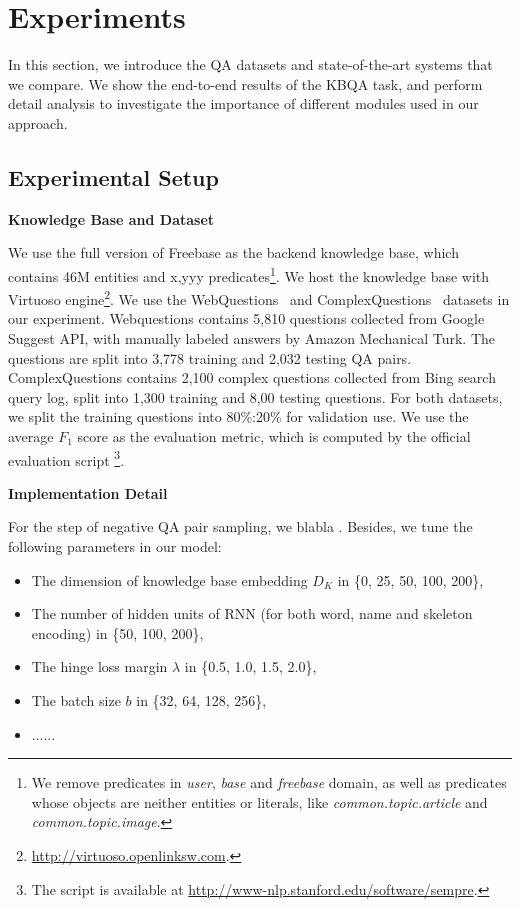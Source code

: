 \section{Experiments}

In this section, we introduce the QA datasets and state-of-the-art systems
that we compare.
We show the end-to-end results of the KBQA task,
and perform detail analysis to investigate the importance of different modules
used in our approach.



\subsection{Experimental Setup}

\noindent
\textbf{Knowledge Base and Dataset}

\noindent
We use the full version of Freebase as the backend knowledge base,
which contains 46M entities and x,yyy predicates\footnote{
We remove predicates in \textit{user}, \textit{base} and \textit{freebase} domain,
as well as predicates whose objects are neither entities or literals, 
like \textit{common.topic.article} and \textit{common.topic.image}.
}.
We host the knowledge base with Virtuoso engine\footnote{\url{http://virtuoso.openlinksw.com}.}.
We use the WebQuestions~\cite{} and ComplexQuestions~\cite{} datasets in our experiment.
Webquestions contains 5,810 questions collected from Google Suggest API,
with manually labeled answers by Amazon Mechanical Turk.
The questions are split into 3,778 training and 2,032 testing QA pairs.
ComplexQuestions contains 2,100 complex questions collected from Bing search query log,
split into 1,300 training and 8,00 testing questions.
For both datasets, we split the training questions into 80\%:20\% for validation use.
We use the average $F_1$ score as the evaluation metric,
which is computed by the official evaluation script
\footnote{The script is available at \url{http://www-nlp.stanford.edu/software/sempre}.}.

\noindent
\textbf{Implementation Detail}

\noindent
For the step of negative QA pair sampling, we blabla .
Besides, we tune the following parameters in our model:
\begin{itemize}
\item The dimension of knowledge base embedding $D_K$ in \{0, 25, 50, 100, 200\},
\item The number of hidden units of RNN (for both word, name and skeleton encoding) in \{50, 100, 200\},
\item The hinge loss margin $\lambda$ in \{0.5, 1.0, 1.5, 2.0\},
\item The batch size $b$ in \{32, 64, 128, 256\},
\item ......
\end{itemize}

